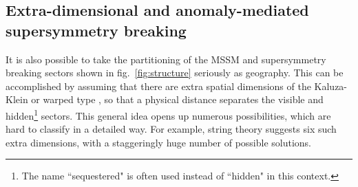 \documentclass[11pt]{article}
\begin{document}
\subsection{Extra-dimensional and anomaly-mediated
supersymmetry breaking}\label{subsec:origins.amsb}
\setcounter{equation}{0}
\setcounter{footnote}{1}

It is also possible to take the partitioning of the MSSM and supersymmetry 
breaking sectors shown in fig.~\ref{fig:structure} seriously as geography. 
This can be accomplished by assuming that there are extra spatial 
dimensions of 
the Kaluza-Klein or warped type \cite{warped}, so that a physical distance 
separates the visible and hidden\footnote{The name ``sequestered" is often 
used instead of ``hidden" in this context.} sectors.  This general idea 
opens up numerous possibilities, which are hard to classify in a detailed 
way. For example, string theory suggests six such extra dimensions, with 
a staggeringly huge number of possible solutions.
\end{document}
